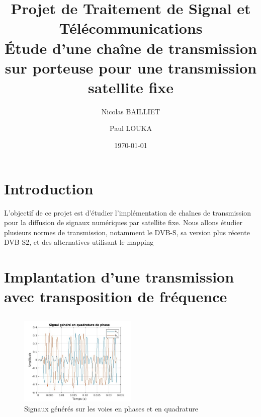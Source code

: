 \documentclass[a4paper, 12pt]{article}
\title{Projet de Traitement de Signal et Télécommunications \\
\Large Étude d’une chaîne de transmission sur porteuse pour une transmission
satellite ﬁxe}
\author{Nicolas BAILLIET \and Paul LOUKA}
\date{\today}
\begin{document}
\maketitle
\tableofcontents


\clearpage
\section{Introduction}

L'objectif de ce projet est d'étudier l'implémentation de chaînes de
transmission pour la diffusion de signaux numériques par satellite fixe. Nous
allons étudier plusieurs normes de transmission, notamment le DVB-S, sa version
plus récente DVB-S2, et des alternatives utilisant le mapping 

\clearpage
\section{Implantation d'une transmission avec transposition de fréquence}

\subsection{}

\begin{figure}[H]
    \centering
    \includegraphics[width=0.5\textwidth]{graphics/1-1.jpg}
    \caption{Signaux générés sur les voies en phases et en quadrature}
    \label{fig:mon_etiquette}
\end{figure}
\end{document}
